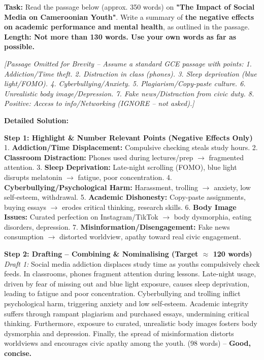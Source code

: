 \documentclass[11pt]{article}
\begin{document}
\begin{exoresolu}
\textbf{Task:} Read the passage below (approx. 350 words) on \textbf{"The Impact of Social Media on Cameroonian Youth"}. Write a summary of \textbf{the negative effects on academic performance and mental health}, as outlined in the passage. \textbf{Length: Not more than 130 words. Use your own words as far as possible.}

\textit{[Passage Omitted for Brevity -- Assume a standard GCE passage with points: 1. Addiction/Time theft. 2. Distraction in class (phones). 3. Sleep deprivation (blue light/FOMO). 4. Cyberbullying/Anxiety. 5. Plagiarism/Copy-paste culture. 6. Unrealistic body image/Depression. 7. Fake news/Distraction from civic duty. 8. Positive: Access to info/Networking (IGNORE -- not asked).]}

\tcblower
\textbf{Detailed Solution:}

\textbf{Step 1: Highlight \& Number Relevant Points (Negative Effects Only)}
1. \textbf{Addiction/Time Displacement:} Compulsive checking steals study hours.
2. \textbf{Classroom Distraction:} Phones used during lectures/prep $\rightarrow$ fragmented attention.
3. \textbf{Sleep Deprivation:} Late-night scrolling (FOMO), blue light disrupts melatonin $\rightarrow$ fatigue, poor concentration.
4. \textbf{Cyberbullying/Psychological Harm:} Harassment, trolling $\rightarrow$ anxiety, low self-esteem, withdrawal.
5. \textbf{Academic Dishonesty:} Copy-paste assignments, buying essays $\rightarrow$ erodes critical thinking, research skills.
6. \textbf{Body Image Issues:} Curated perfection on Instagram/TikTok $\rightarrow$ body dysmorphia, eating disorders, depression.
7. \textbf{Misinformation/Disengagement:} Fake news consumption $\rightarrow$ distorted worldview, apathy toward real civic engagement.

\textbf{Step 2: Drafting -- Combining \& Nominalising (Target $\approx$ 120 words)}
\textit{Draft 1:} Social media addiction displaces study time as youths compulsively check feeds. In classrooms, phones fragment attention during lessons. Late-night usage, driven by fear of missing out and blue light exposure, causes sleep deprivation, leading to fatigue and poor concentration. Cyberbullying and trolling inflict psychological harm, triggering anxiety and low self-esteem. Academic integrity suffers through rampant plagiarism and purchased essays, undermining critical thinking. Furthermore, exposure to curated, unrealistic body images fosters body dysmorphia and depression. Finally, the spread of misinformation distorts worldviews and encourages civic apathy among the youth. (98 words) -- \textbf{Good, concise.}


\end{exoresolu}
\end{document}
